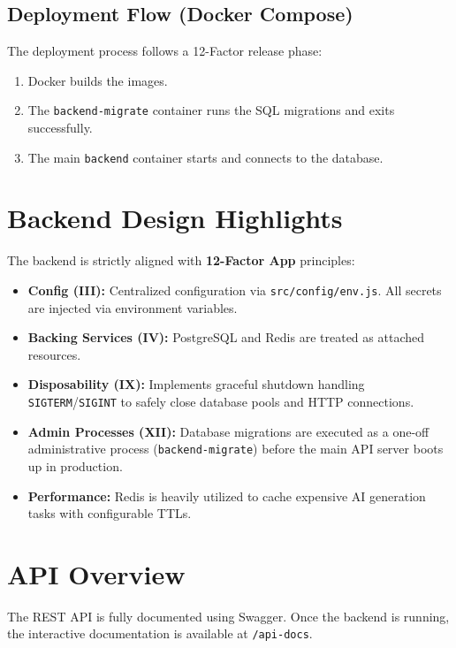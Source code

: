 \documentclass[12pt,a4paper]{article}
\begin{document}
\subsection{Deployment Flow (Docker Compose)}
The deployment process follows a 12-Factor release phase:
\begin{enumerate}
    \item Docker builds the images.
    \item The \texttt{backend-migrate} container runs the SQL migrations and exits successfully.
    \item The main \texttt{backend} container starts and connects to the database.
\end{enumerate}

\section{Backend Design Highlights}
The backend is strictly aligned with \textbf{12-Factor App} principles:
\begin{itemize}
    \item \textbf{Config (III):} Centralized configuration via \texttt{src/config/env.js}. All secrets are injected via environment variables.
    \item \textbf{Backing Services (IV):} PostgreSQL and Redis are treated as attached resources.
    \item \textbf{Disposability (IX):} Implements graceful shutdown handling \texttt{SIGTERM}/\texttt{SIGINT} to safely close database pools and HTTP connections.
    \item \textbf{Admin Processes (XII):} Database migrations are executed as a one-off administrative process (\texttt{backend-migrate}) before the main API server boots up in production.
    \item \textbf{Performance:} Redis is heavily utilized to cache expensive AI generation tasks with configurable TTLs.
\end{itemize}

\section{API Overview}
The REST API is fully documented using Swagger. Once the backend is running, the interactive documentation is available at \texttt{/api-docs}.
\end{document}
